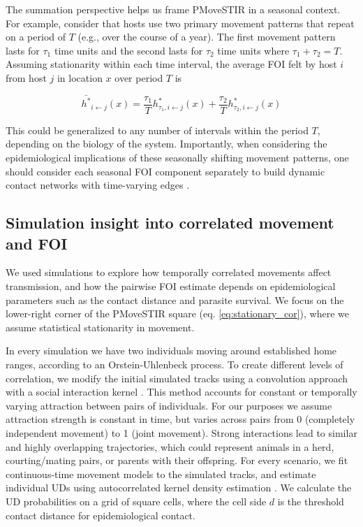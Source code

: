 \documentclass[letterpaper]{article}
\begin{document}
The summation perspective helps us frame PMoveSTIR in a seasonal context.  For example, consider that hosts use two primary movement patterns that repeat on a period of $T$ (e.g., over the course of a year).  The first movement pattern lasts for $\tau_1$ time units and the second lasts for $\tau_2$ time units where $\tau_1 + \tau_2 = T$.  Assuming stationarity within each time interval, the average FOI felt by host $i$ from host $j$ in location $x$ over period $T$ is 

\begin{equation}
\bar{h^*}_{i \leftarrow j}(x) = \frac{\tau_1}{T} h^*_{\tau_1, i \leftarrow j}(x) + \frac{\tau_2}{T} h^*_{\tau_2, i \leftarrow j}(x)
\label{eq:seasonal}
\end{equation}

This could be generalized to any number of intervals within the period $T$, depending on the biology of the system.  Importantly, when considering the epidemiological implications of these seasonally shifting movement patterns, one should consider each seasonal FOI component separately to build dynamic contact networks with time-varying edges \citep{Wilber2022}.


\subsection*{Simulation insight into correlated movement and FOI}

We used simulations to explore how temporally correlated movements affect  transmission, and how the pairwise FOI estimate depends on epidemiological parameters such as the contact distance and parasite survival. We focus on the lower-right corner of the PMoveSTIR square (eq. \ref{eq:stationary_cor}), where we assume statistical stationarity in movement. 

In every simulation we have two individuals moving around established home ranges, according to an Orstein-Uhlenbeck process. To create different levels of correlation, we modify the initial simulated tracks using a convolution approach with a social interaction kernel \citep{Scharf2018}. This method accounts for constant or temporally varying attraction between pairs of individuals. For our purposes we assume attraction strength is constant in time, but varies across pairs from 0 (completely independent movement) to 1 (joint movement). Strong interactions lead to similar and highly overlapping trajectories, which could represent animals in a herd, courting/mating pairs, or parents with their offspring.
For every scenario, we fit continuous-time movement models to the simulated tracks, and estimate individual UDs using autocorrelated kernel density estimation \citep{Calabrese2016}. We calculate the UD probabilities on a grid of square cells, where the cell side $d$ is the threshold contact distance for epidemiological contact. 
\end{document}
